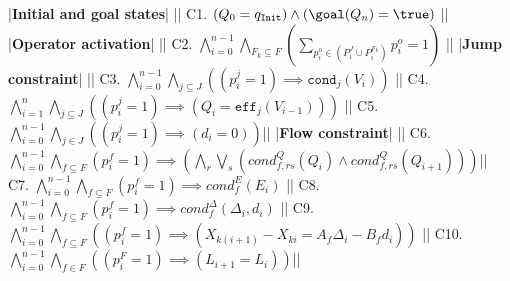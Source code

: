 |\textbf{Initial and goal states}| |\vspace{5pt}|
C1. $(Q_0= q_{\mathtt{Init}}) \land (\goal(Q_n) = \true)$ |\vspace{5pt}|
|\textbf{Operator activation}| |\vspace{5pt}|
C2. $\bigwedge_{i = 0}^{n-1} \bigwedge_{F_k \subseteq F} (\sum_{p_i^o \in (P^J_i \cup  P^{F_k}_i)} p_i^o = 1)$ |\vspace{5pt}|
|\textbf{Jump constraint}| |\vspace{5pt}|
C3. $\bigwedge_{i = 0}^{n-1} \bigwedge_{j \subseteq J}  ((p^j_i = 1) \implies \texttt{cond}_j(V_i))$ |\vspace{5pt}|
C4. $\bigwedge_{i = 1}^{n} \bigwedge_{j \subseteq J}  ((p^j_i = 1) \implies (Q_i = \texttt{eff}_j(V_{i-1})))$ |\vspace{5pt}|
C5. $\bigwedge_{i = 0}^{n-1} \bigwedge_{j \in J}  ((p^j_i = 1) \implies (d_i = 0))$|\vspace{5pt}|
|\textbf{Flow constraint}| |\vspace{5pt}|
C6. $\bigwedge_{i = 0}^{n-1} \bigwedge_{f \subseteq F} (p_i^f = 1) \implies (\bigwedge_r \bigvee_s (\textit{cond}^Q_{f,rs} (Q_{i}) \land \textit{cond}^Q_{f,rs} (Q_{i+1}))) $|\vspace{5pt}|
C7. $\bigwedge_{i = 0}^{n-1} \bigwedge_{f \subseteq F} (p_i^f = 1) \implies \textit{cond}^E_{f} (E_{i})  $ |\vspace{5pt}|
C8. $\bigwedge_{i = 0}^{n-1} \bigwedge_{f \subseteq F} (p_i^f = 1) \implies \textit{cond}^\Delta_{f} (\Delta_{i}, d_i)  $ |\vspace{5pt}|
C9. $\bigwedge_{i = 0}^{n-1} \bigwedge_{f \subseteq F} ((p^f_i=1) \implies (X_{k(i+1)} - X_{ki} = A_f \Delta_i - B_fd_i))$ |\vspace{5pt}|
C10. $\bigwedge_{i = 0}^{n-1} \bigwedge_{f \in F}  ((p_i^F = 1) \implies (L_{i+1} = L_i))$|\vspace{5pt}|



